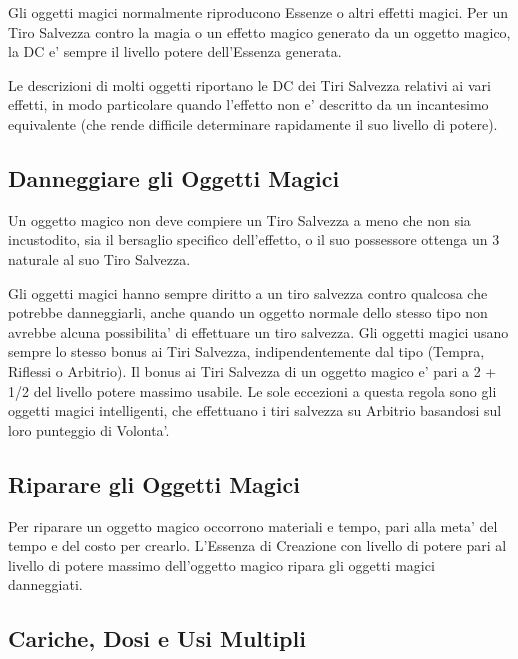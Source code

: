 \documentclass[a4paper,11pt,twoside,openany]{book}
\begin{document}
{		\label{tiri-salvezza-contro-i-poteri-degli-oggetti-magici}
		
		Gli oggetti magici normalmente riproducono Essenze o altri effetti magici. Per un Tiro Salvezza contro la magia o un effetto magico generato da un oggetto magico, la DC e' sempre il livello potere dell'Essenza generata.
		
		Le descrizioni di molti oggetti riportano le DC dei Tiri Salvezza relativi ai vari effetti, in modo particolare quando l'effetto non e' descritto da un incantesimo equivalente (che rende difficile determinare rapidamente il suo livello di potere).
		
		
		\subsection{Danneggiare gli Oggetti Magici}
		
		\label{danneggiare-gli-oggetti-magici}
		
		Un oggetto magico non deve compiere un Tiro Salvezza a meno che non sia incustodito, sia il bersaglio specifico dell'effetto, o il suo possessore ottenga un 3 naturale al suo Tiro Salvezza. 
		
		Gli oggetti magici hanno sempre diritto a un tiro salvezza contro qualcosa che potrebbe danneggiarli, anche quando un oggetto normale dello stesso tipo non avrebbe alcuna possibilita' di effettuare un tiro salvezza. Gli oggetti magici usano sempre lo stesso bonus ai Tiri Salvezza, indipendentemente dal tipo (Tempra, Riflessi o Arbitrio). Il bonus ai Tiri Salvezza di un oggetto magico e' pari a 2 + 1/2 del livello potere massimo usabile. Le sole eccezioni a questa regola sono gli oggetti magici intelligenti, che effettuano i tiri salvezza su Arbitrio basandosi sul loro punteggio di Volonta'.
		
		
		\subsection{Riparare gli Oggetti Magici}
		\label{riparare-gli-oggetti-magici}
		
		Per riparare un oggetto magico occorrono materiali e tempo, pari alla meta' del tempo e del costo per crearlo. L'Essenza di Creazione con livello di potere pari al livello di potere massimo dell'oggetto magico ripara gli oggetti magici danneggiati.
		
		
		\subsection{Cariche, Dosi e Usi Multipli}
		
}
\end{document}

